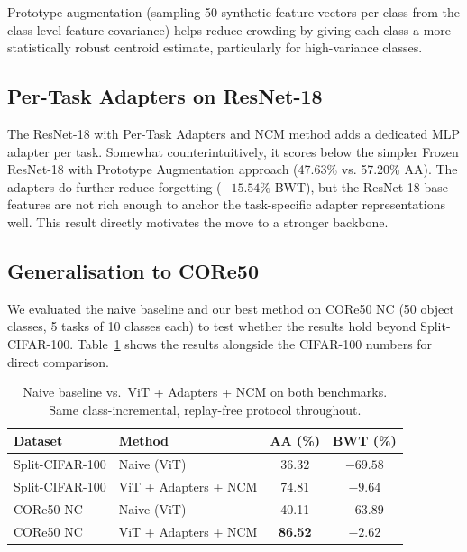 \documentclass{article}
\begin{document}
Prototype augmentation (sampling 50 synthetic feature vectors per class from
the class-level feature covariance) helps reduce crowding by giving each class
a more statistically robust centroid estimate, particularly for high-variance
classes.

\subsection{Per-Task Adapters on ResNet-18}

The ResNet-18 with Per-Task Adapters and NCM method adds a dedicated MLP adapter
per task. Somewhat counterintuitively, it scores below the simpler Frozen
ResNet-18 with Prototype Augmentation approach (47.63\% vs. 57.20\% AA). The
adapters do further reduce forgetting ($-15.54\%$ BWT), but the ResNet-18 base
features are not rich enough to anchor the task-specific adapter representations
well. This result directly motivates the move to a stronger backbone.

\subsection{Generalisation to CORe50}

We evaluated the naive baseline and our best method on CORe50 NC
\citep{lomonaco2017core50} (50 object classes, 5 tasks of 10 classes each)
to test whether the results hold beyond Split-CIFAR-100.
Table~\ref{tab:core50} shows the results alongside the CIFAR-100 numbers
for direct comparison.

\begin{table}[h]
\centering
\caption{Naive baseline vs.\ ViT + Adapters + NCM on both benchmarks.
Same class-incremental, replay-free protocol throughout.}
\label{tab:core50}
\renewcommand{\arraystretch}{1.2}
\begin{tabular}{llcc}
\toprule
\textbf{Dataset} & \textbf{Method} & \textbf{AA (\%)} & \textbf{BWT (\%)} \\
\midrule
Split-CIFAR-100 & Naive (ViT)          & 36.32 & $-69.58$ \\
Split-CIFAR-100 & ViT + Adapters + NCM & 74.81 & $-9.64$  \\
\midrule
CORe50 NC       & Naive (ViT)          & 40.11 & $-63.89$ \\
CORe50 NC       & ViT + Adapters + NCM & \textbf{86.52} & $\mathbf{-2.62}$ \\
\bottomrule
\end{tabular}
\end{table}
\end{document}
